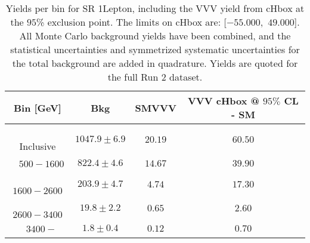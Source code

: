 \begin{table}[!htbp]
    \small
    \center
    \begin{tabular}{c||c|c|c}
    Bin [GeV] & Bkg & SMVVV & \pbox{20cm}{VVV \\ cHbox @ $95\%$ CL - SM \\ }\\
    \hline
    \pbox{20cm}{ ~ \\Inclusive\\ } & $1047.9 \pm 6.9$ & $20.19$ & $60.50$\\
    \hline
    \pbox{20cm}{ ~ \\$500-1600$\\ } & $822.4 \pm 4.6$ & $14.67$ & $39.90$\\
    \hline
    \pbox{20cm}{ ~ \\$1600-2600$\\ } & $203.9 \pm 4.7$ & $4.74$ & $17.30$\\
    \hline
    \pbox{20cm}{ ~ \\$2600-3400$\\ } & $19.8 \pm 2.2$ & $0.65$ & $2.60$\\
    \hline
    \pbox{20cm}{ ~ \\$3400-$\\ } & $1.8 \pm 0.4$ & $0.12$ & $0.70$\\
\end{tabular}
    \caption{Yields per bin for SR 1Lepton, including the VVV yield from cHbox at the $95$\% exclusion point. The limits on cHbox are: [$-55.000$,~$49.000$]. All Monte Carlo background yields have been combined, and the statistical uncertainties and symmetrized systematic uncertainties for the total background are added in quadrature. Yields are quoted for the full Run 2 dataset.}
    \label{tab:1Lepton$binssignal}
\end{table}
